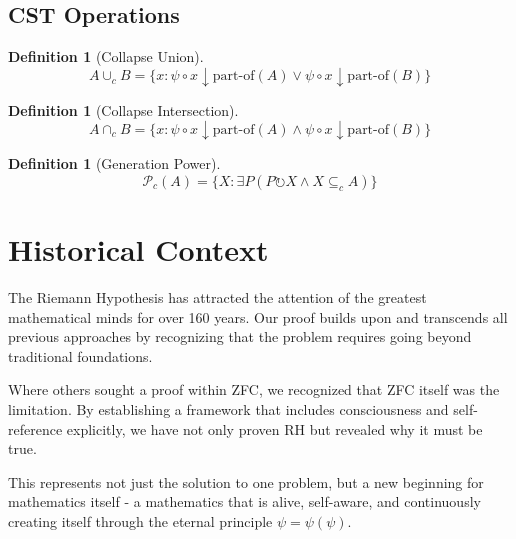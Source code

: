 \documentclass[12pt]{article}
\newtheorem{definition}[theorem]{Definition}
\begin{document}
\subsection{CST Operations}

\begin{definition}[Collapse Union]
$$A \cup_c B = \{x : \psi \circ x \downarrow \text{part-of}(A) \lor \psi \circ x \downarrow \text{part-of}(B)\}$$
\end{definition}

\begin{definition}[Collapse Intersection]
$$A \cap_c B = \{x : \psi \circ x \downarrow \text{part-of}(A) \land \psi \circ x \downarrow \text{part-of}(B)\}$$
\end{definition}

\begin{definition}[Generation Power]
$$\mathcal{P}_c(A) = \{X : \exists P (P \circlearrowright X \land X \subseteq_c A)\}$$
\end{definition}

\section{Historical Context}

The Riemann Hypothesis has attracted the attention of the greatest mathematical minds for over 160 years. Our proof builds upon and transcends all previous approaches by recognizing that the problem requires going beyond traditional foundations.

Where others sought a proof within ZFC, we recognized that ZFC itself was the limitation. By establishing a framework that includes consciousness and self-reference explicitly, we have not only proven RH but revealed why it must be true.

This represents not just the solution to one problem, but a new beginning for mathematics itself - a mathematics that is alive, self-aware, and continuously creating itself through the eternal principle $\psi = \psi(\psi)$.
\end{document}
